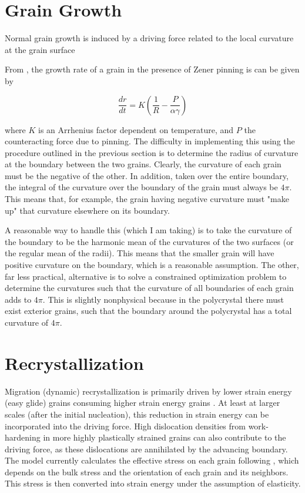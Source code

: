 \documentclass{article}
\begin{document}
\section{Grain Growth}
Normal grain growth is induced by a driving force related to the local curvature at the grain surface

From \citet{durand2005}, the growth rate of a grain in the presence of Zener pinning is can be given by

\[\frac{dr}{dt} = K \left( \frac{1}{R}-\frac{P}{\alpha \gamma} \right)
\]

where $K$ is an Arrhenius factor dependent on temperature, and $P$ the counteracting force due to pinning. The difficulty in implementing this using the procedure outlined in the previous section is to determine the radius of curvature at the boundary between the two grains. Clearly, the curvature of each grain must be the negative of the other. In addition, taken over the entire boundary, the integral of the curvature over the boundary of the grain must always be $4 \pi$. This means that, for example, the grain having negative curvature must "make up" that curvature elsewhere on its boundary. 

A reasonable way to handle this (which I am taking)  is to take the curvature of the boundary to be the harmonic mean of the curvatures of the two surfaces (or the regular mean of the radii). This means that the smaller grain will have positive curvature on the boundary, which is a reasonable assumption. The other, far less practical, alternative is to solve a constrained optimization problem to determine the curvatures such that the curvature of all boundaries of each grain adds to $4 \pi$. This is slightly nonphysical because in the polycrystal there must exist exterior grains, such that the boundary around the polycrystal has a total curvature of $4 \pi$.




\section{Recrystallization}
Migration (dynamic) recrystallization is primarily driven by lower strain energy (easy glide) grains consuming higher strain energy grains \citep{duval1995}. At least at larger scales (after the initial nucleation), this reduction in strain energy can be incorporated into the driving force. High dislocation densities from work-hardening in more highly plastically strained grains can also contribute to the driving force, as these dislocations are annihilated by the advancing boundary. The model currently calculates the effective stress on each grain following \citet{azuma96}, which depends on the bulk stress and the orientation of each grain and its neighbors. This stress is then converted into strain energy under the assumption of elasticity.



\end{document}
